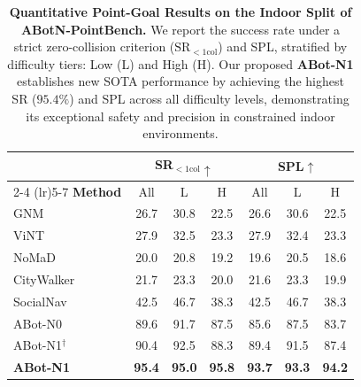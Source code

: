 \begin{table}[t]
\centering
\caption{\textbf{Quantitative Point-Goal Results on the Indoor Split of ABotN-PointBench.} 
We report the success rate under a strict zero-collision criterion ($\text{SR}_{<1\text{col}}$) and SPL, stratified by difficulty tiers: Low (L) and High (H). 
Our proposed \textbf{ABot-N1} establishes new SOTA performance by achieving the highest SR ($95.4\%$) and SPL across all difficulty levels, demonstrating its exceptional safety and precision in constrained indoor environments.}

\label{tab:exp-pointgoal-in}
\small
\setlength{\tabcolsep}{6.0pt}
\begin{tabular}{l ccc ccc}
\toprule
 & \multicolumn{3}{c}{\textbf{SR$_{<1\text{col}}\uparrow$}} & \multicolumn{3}{c}{\textbf{SPL$\uparrow$}} \\
\cmidrule(lr){2-4} \cmidrule(lr){5-7}
\textbf{Method} & All & L & H & All & L & H \\
\midrule
GNM~\cite{shah2023gnm}                & 26.7 & 30.8 & 22.5 & 26.6 & 30.6 & 22.5 \\
ViNT~\cite{shah2023vint}              & 27.9 & 32.5 & 23.3 & 27.9 & 32.4 & 23.3 \\
NoMaD~\cite{sridhar2024nomad}         & 20.0 & 20.8 & 19.2 & 19.6 & 20.5 & 18.6 \\
CityWalker~\cite{liu2025citywalker}   & 21.7 & 23.3 & 20.0 & 21.6 & 23.3 & 19.9 \\
SocialNav~\cite{chen2025socialnav}    & 42.5 & 46.7 & 38.3 & 42.5 & 46.7 & 38.3 \\
ABot-N0~\cite{abotn0}                 & 89.6 & 91.7 & 87.5 & 85.6 & 87.5 & 83.7 \\
\midrule
ABot-N1$^\dagger$                     & 90.4 & 92.5 & 88.3 & 89.4 & 91.5 & 87.4 \\
\textbf{ABot-N1}                      & \textbf{95.4} & \textbf{95.0} & \textbf{95.8} & \textbf{93.7} & \textbf{93.3} & \textbf{94.2} \\
\bottomrule
\end{tabular}
\end{table}

